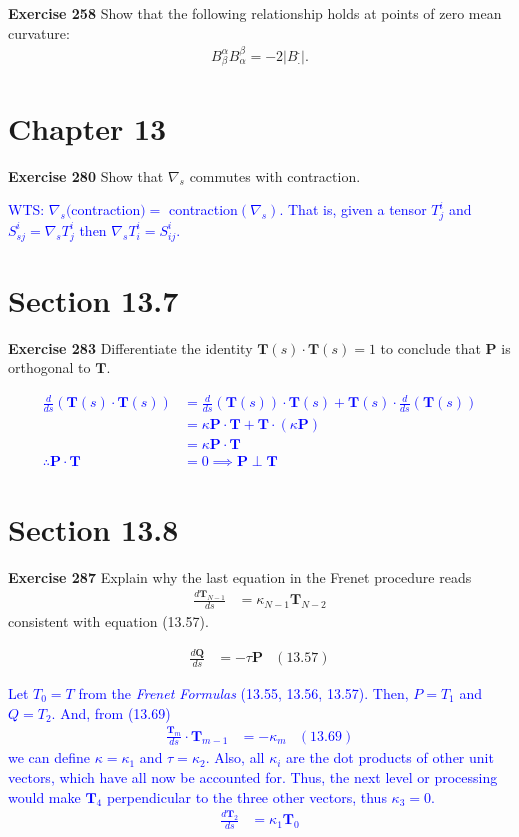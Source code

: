 \documentclass[12pt,a4paper]{report}
\newcommand{\BLUE}[1]{\textcolor{blue}{#1}}
\begin{document}
\textbf{Exercise 258} Show that  the following relationship holds at points of zero mean curvature:
\begin{align*}
	B^\alpha_\beta B^\beta_\alpha = -2 |B^._.|.
\end{align*}

\section*{Chapter 13}
\textbf{Exercise 280}  Show that $\nabla_s$ commutes with contraction.

\BLUE{WTS: $\nabla_s ($contraction$)=$ contraction$(\nabla_s)$.  That is, given a tensor $T^i_j$ and $S^i_{sj} = \nabla_s T^i_j$ then $\nabla_s T^i_i = S^i_{ij}$.
}


\section*{Section 13.7}

\textbf{Exercise 283} Differentiate the identity $\textbf{T}(s)\cdot\textbf{T}(s)=1$ to conclude that $\textbf{P}$ is orthogonal to $\textbf{T}$.

\BLUE{
\begin{align*}
	\frac{d}{ds}(\textbf{T}(s)\cdot\textbf{T}(s)) &= \frac{d}{ds}(\textbf{T}(s))\cdot\textbf{T}(s) + \textbf{T}(s)\cdot\frac{d}{ds}(\textbf{T}(s)) \\
		&= \kappa\textbf{P}\cdot\textbf{T} + \textbf{T}\cdot(\kappa\textbf{P}) \\
		&= \kappa\textbf{P}\cdot\textbf{T} \\
	\therefore \textbf{P}\cdot\textbf{T} &= 0 \implies \textbf{P} \perp \textbf{T}
\end{align*}
}


\section*{Section 13.8}

\textbf{Exercise 287}  Explain why the last equation in the Frenet procedure reads
\begin{align*}
	\frac{d\textbf{T}_{N-1}}{ds} &= \kappa_{N-1}\textbf{T}_{N-2}
\end{align*}consistent with equation (13.57).

\begin{align*}
	\frac{d\textbf{Q}}{ds} &= -\tau\textbf{P} & (13.57)
\end{align*}

\BLUE{Let $T_0 = T$ from the \textit{Frenet Formulas} (13.55, 13.56, 13.57).  Then, $P = T_1$ and $Q = T_2$.  And, from (13.69)
\begin{align*}
	\frac{\textbf{T}_m}{ds}\cdot\textbf{T}_{m-1} &= -\kappa_m & (13.69)
\end{align*}we can define $\kappa = \kappa_1$ and $\tau = \kappa_2$. Also, all $\kappa_i$ are the dot products of other unit vectors, which have all now be accounted for.  Thus, the next level or processing would make $\textbf{T}_4$ perpendicular to the three other vectors, thus $\kappa_3 = 0$.
\begin{align*}
	\frac{d\textbf{T}_2}{ds} &= \kappa_{1}\textbf{T}_0
\end{align*}
}
\end{document}
